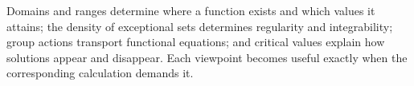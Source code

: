 Domains and ranges determine where a function exists and which values it attains; the density of exceptional sets determines regularity and integrability; group actions transport functional equations; and critical values explain how solutions appear and disappear. Each viewpoint becomes useful exactly when the corresponding calculation demands it.
